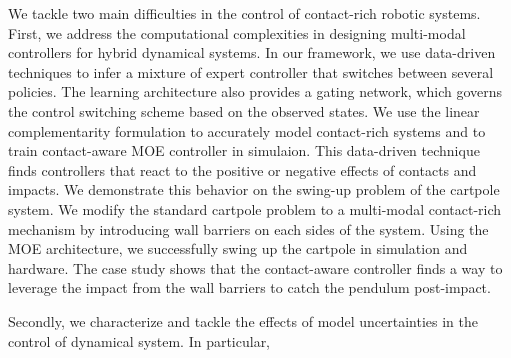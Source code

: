We tackle two main difficulties in the control of contact-rich robotic systems.
%
First, we address the computational complexities in designing multi-modal
controllers for hybrid dynamical systems.
%
In our framework, we use data-driven techniques to infer a mixture of expert
controller that switches between several policies.
%
The learning architecture also provides a gating network, which governs the
control switching scheme based on the observed states.
%
We use the linear complementarity formulation to accurately model
contact-rich systems and to train contact-aware MOE controller in simulaion.
%
This data-driven technique finds controllers that react to the positive or negative
effects of contacts and impacts.
%
We demonstrate this behavior on the swing-up problem of the cartpole system.
%
We modify the standard cartpole problem to a multi-modal contact-rich mechanism
by introducing wall barriers on each sides of the system.
%
Using the MOE architecture, we successfully swing up the cartpole in simulation
and hardware.
%
The case study shows that the contact-aware controller finds a way to leverage the impact
from the wall barriers to catch the pendulum post-impact.
%

Secondly, we characterize and tackle the effects of model uncertainties in the
control of dynamical system.
%
In particular, 